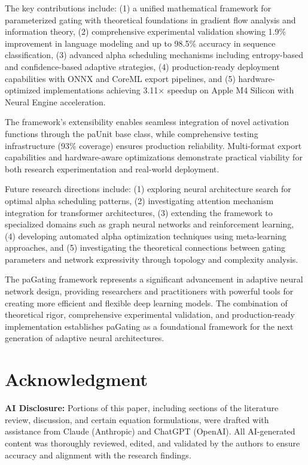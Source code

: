 \documentclass[lettersize,journal]{IEEEtran}
\begin{document}
The key contributions include: (1) a unified mathematical framework for parameterized gating with theoretical foundations in gradient flow analysis and information theory, (2) comprehensive experimental validation showing 1.9\% improvement in language modeling and up to 98.5\% accuracy in sequence classification, (3) advanced alpha scheduling mechanisms including entropy-based and confidence-based adaptive strategies, (4) production-ready deployment capabilities with ONNX and CoreML export pipelines, and (5) hardware-optimized implementations achieving 3.11× speedup on Apple M4 Silicon with Neural Engine acceleration.

The framework's extensibility enables seamless integration of novel activation functions through the paUnit base class, while comprehensive testing infrastructure (93\% coverage) ensures production reliability. Multi-format export capabilities and hardware-aware optimizations demonstrate practical viability for both research experimentation and real-world deployment.

Future research directions include: (1) exploring neural architecture search for optimal alpha scheduling patterns, (2) investigating attention mechanism integration for transformer architectures, (3) extending the framework to specialized domains such as graph neural networks and reinforcement learning, (4) developing automated alpha optimization techniques using meta-learning approaches, and (5) investigating the theoretical connections between gating parameters and network expressivity through topology and complexity analysis.

The paGating framework represents a significant advancement in adaptive neural network design, providing researchers and practitioners with powerful tools for creating more efficient and flexible deep learning models. The combination of theoretical rigor, comprehensive experimental validation, and production-ready implementation establishes paGating as a foundational framework for the next generation of adaptive neural architectures.

\section*{Acknowledgment}
\textbf{AI Disclosure:} Portions of this paper, including sections of the literature review, discussion, and certain equation formulations, were drafted with assistance from Claude (Anthropic) and ChatGPT (OpenAI). All AI-generated content was thoroughly reviewed, edited, and validated by the authors to ensure accuracy and alignment with the research findings.
\end{document}

